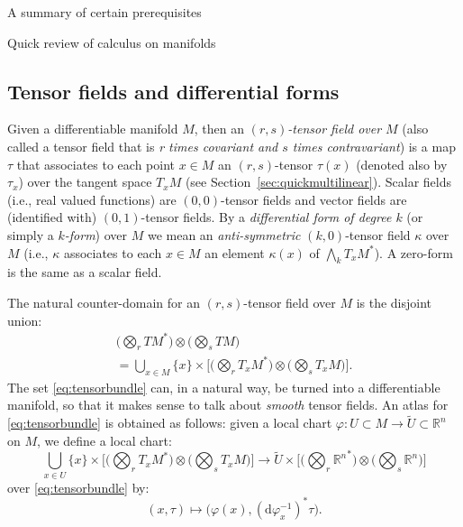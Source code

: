 \documentclass[oneside,a4paper,11pt]{amsbook}
\newcommand{\R}{\mathds R}
\newcommand{\dd}{\mathrm d}
\theoremstyle{remark}\newtheorem{exercise}{Exercise}[chapter]
\theoremstyle{plain}\newtheorem{teo}{Theorem}[section]
\theoremstyle{plain}\newtheorem{lem}[teo]{Lemma}
\theoremstyle{plain}\newtheorem{prop}[teo]{Proposition}
\theoremstyle{plain}\newtheorem{cor}[teo]{Corollary}
\theoremstyle{definition}\newtheorem{defin}[teo]{Definition}
\theoremstyle{remark}\newtheorem{rem}[teo]{Remark}
\theoremstyle{definition}\newtheorem{notation}[teo]{Notation}
\theoremstyle{definition}\newtheorem{convention}[teo]{Convention}
\theoremstyle{definition}\newtheorem{example}[teo]{Example}
\numberwithin{section}{chapter}
\numberwithin{equation}{section}
\begin{document}
\begin{chapter}{A summary of certain prerequisites}
\begin{section}{Quick review of calculus on manifolds}
\subsection{Tensor fields and differential forms}
\label{sub:TensorForms}

Given a differentiable manifold $M$, then an {\em $(r,s)$-tensor field over $M$\/} (also called a tensor field that is
{\em r times covariant and $s$ times contravariant}) is a map $\tau$
that associates to each point $x\in M$ an $(r,s)$-tensor $\tau(x)$ (denoted also by $\tau_x$) over the tangent space $T_xM$ (see Section~\ref{sec:quickmultilinear}).
Scalar fields (i.e., real valued functions) are $(0,0)$-tensor fields and
vector fields are (identified with) $(0,1)$-tensor fields. By a {\em differential form of degree $k$\/}
(or simply a {\em $k$-form}) over $M$ we mean an {\em anti-symmetric\/} $(k,0)$-tensor field $\kappa$ over $M$ (i.e., $\kappa$
associates to each $x\in M$ an element $\kappa(x)$ of $\bigwedge_kT_xM^*$). A zero-form is the same as a scalar field.

The natural counter-domain for an $(r,s)$-tensor field over $M$ is the disjoint union:
\begin{multline}\label{eq:tensorbundle}
\Big(\bigotimes_rTM^*\Big)\otimes\Big(\bigotimes_sTM\Big)\\
=\bigcup_{x\in M}\{x\}\times\Big[\Big(\bigotimes_rT_xM^*\Big)\otimes\Big(\bigotimes_sT_xM\Big)\Big].
\end{multline}
The set \eqref{eq:tensorbundle} can, in a natural way, be turned into a differentiable manifold, so that it makes sense to talk about {\em smooth\/}
tensor fields. An atlas for \eqref{eq:tensorbundle} is obtained as follows: given a local chart $\varphi:U\subset M\to\widetilde U\subset\R^n$
on $M$, we define a local chart:
\[\bigcup_{x\in U}\{x\}\times\Big[\Big(\bigotimes_rT_xM^*\Big)\otimes\Big(\bigotimes_sT_xM\Big)\Big]\longrightarrow\widetilde U\times\Big[\Big(\bigotimes_r{\R^n}^*\Big)\otimes
\Big(\bigotimes_s\R^n\Big)\Big]\]
over \eqref{eq:tensorbundle} by:
\[(x,\tau)\longmapsto\big(\varphi(x),(\dd\varphi_x^{-1})^*\tau\big).\]

\medskip


\end{section}
\end{chapter}
\end{document}
